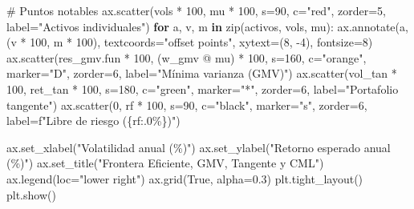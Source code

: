 \documentclass[
  spanish,
  letterpaper,
  DIV=11,
  numbers=noendperiod]{scrreprt}
\newenvironment{Shaded}{\begin{snugshade}}{\end{snugshade}}
\newcommand{\BuiltInTok}[1]{\textcolor[rgb]{0.00,0.23,0.31}{#1}}
\newcommand{\CommentTok}[1]{\textcolor[rgb]{0.37,0.37,0.37}{#1}}
\newcommand{\ControlFlowTok}[1]{\textcolor[rgb]{0.00,0.23,0.31}{\textbf{#1}}}
\newcommand{\DecValTok}[1]{\textcolor[rgb]{0.68,0.00,0.00}{#1}}
\newcommand{\FloatTok}[1]{\textcolor[rgb]{0.68,0.00,0.00}{#1}}
\newcommand{\KeywordTok}[1]{\textcolor[rgb]{0.00,0.23,0.31}{\textbf{#1}}}
\newcommand{\NormalTok}[1]{\textcolor[rgb]{0.00,0.23,0.31}{#1}}
\newcommand{\OperatorTok}[1]{\textcolor[rgb]{0.37,0.37,0.37}{#1}}
\newcommand{\SpecialCharTok}[1]{\textcolor[rgb]{0.37,0.37,0.37}{#1}}
\newcommand{\SpecialStringTok}[1]{\textcolor[rgb]{0.13,0.47,0.30}{#1}}
\newcommand{\StringTok}[1]{\textcolor[rgb]{0.13,0.47,0.30}{#1}}
\newcommand{\VariableTok}[1]{\textcolor[rgb]{0.07,0.07,0.07}{#1}}
\begin{document}
\begin{Shaded}
\begin{Highlighting}[]
\CommentTok{\# Puntos notables}
\NormalTok{ax.scatter(vols }\OperatorTok{*} \DecValTok{100}\NormalTok{, mu }\OperatorTok{*} \DecValTok{100}\NormalTok{, s}\OperatorTok{=}\DecValTok{90}\NormalTok{, c}\OperatorTok{=}\StringTok{"red"}\NormalTok{, zorder}\OperatorTok{=}\DecValTok{5}\NormalTok{, label}\OperatorTok{=}\StringTok{"Activos individuales"}\NormalTok{)}
\ControlFlowTok{for}\NormalTok{ a, v, m }\KeywordTok{in} \BuiltInTok{zip}\NormalTok{(activos, vols, mu):}
\NormalTok{    ax.annotate(a, (v }\OperatorTok{*} \DecValTok{100}\NormalTok{, m }\OperatorTok{*} \DecValTok{100}\NormalTok{), textcoords}\OperatorTok{=}\StringTok{"offset points"}\NormalTok{,}
\NormalTok{                xytext}\OperatorTok{=}\NormalTok{(}\DecValTok{8}\NormalTok{, }\OperatorTok{{-}}\DecValTok{4}\NormalTok{), fontsize}\OperatorTok{=}\DecValTok{8}\NormalTok{)}
\NormalTok{ax.scatter(res\_gmv.fun }\OperatorTok{*} \DecValTok{100}\NormalTok{, (w\_gmv }\OperatorTok{@}\NormalTok{ mu) }\OperatorTok{*} \DecValTok{100}\NormalTok{, s}\OperatorTok{=}\DecValTok{160}\NormalTok{, c}\OperatorTok{=}\StringTok{"orange"}\NormalTok{, marker}\OperatorTok{=}\StringTok{"D"}\NormalTok{,}
\NormalTok{           zorder}\OperatorTok{=}\DecValTok{6}\NormalTok{, label}\OperatorTok{=}\StringTok{"Mínima varianza (GMV)"}\NormalTok{)}
\NormalTok{ax.scatter(vol\_tan }\OperatorTok{*} \DecValTok{100}\NormalTok{, ret\_tan }\OperatorTok{*} \DecValTok{100}\NormalTok{, s}\OperatorTok{=}\DecValTok{180}\NormalTok{, c}\OperatorTok{=}\StringTok{"green"}\NormalTok{, marker}\OperatorTok{=}\StringTok{"*"}\NormalTok{,}
\NormalTok{           zorder}\OperatorTok{=}\DecValTok{6}\NormalTok{, label}\OperatorTok{=}\StringTok{"Portafolio tangente"}\NormalTok{)}
\NormalTok{ax.scatter(}\DecValTok{0}\NormalTok{, rf }\OperatorTok{*} \DecValTok{100}\NormalTok{, s}\OperatorTok{=}\DecValTok{90}\NormalTok{, c}\OperatorTok{=}\StringTok{"black"}\NormalTok{, marker}\OperatorTok{=}\StringTok{"s"}\NormalTok{, zorder}\OperatorTok{=}\DecValTok{6}\NormalTok{,}
\NormalTok{           label}\OperatorTok{=}\SpecialStringTok{f"Libre de riesgo (}\SpecialCharTok{\{}\NormalTok{rf}\SpecialCharTok{:.0\%\}}\SpecialStringTok{)"}\NormalTok{)}

\NormalTok{ax.set\_xlabel(}\StringTok{"Volatilidad anual (\%)"}\NormalTok{)}
\NormalTok{ax.set\_ylabel(}\StringTok{"Retorno esperado anual (\%)"}\NormalTok{)}
\NormalTok{ax.set\_title(}\StringTok{"Frontera Eficiente, GMV, Tangente y CML"}\NormalTok{)}
\NormalTok{ax.legend(loc}\OperatorTok{=}\StringTok{"lower right"}\NormalTok{)}
\NormalTok{ax.grid(}\VariableTok{True}\NormalTok{, alpha}\OperatorTok{=}\FloatTok{0.3}\NormalTok{)}
\NormalTok{plt.tight\_layout()}
\NormalTok{plt.show()}
\end{Highlighting}
\end{Shaded}
\end{document}
